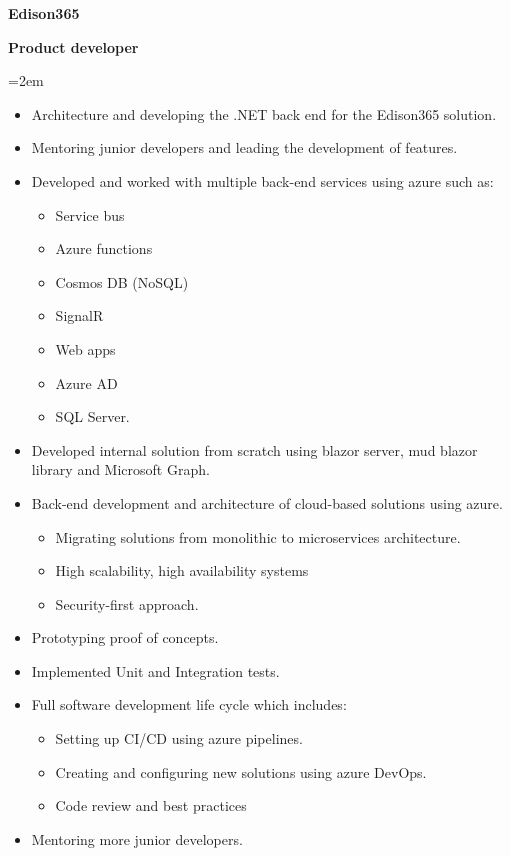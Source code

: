 \documentclass[paper=a4,fontsize=12pt]{article} %
\newcommand{\EducationEntry}[4]{
		\noindent \textbf{#1} \hfill      %
		\colorbox{White}{%
			\parbox{6em}{%
			\hfill\color{Black}#2}} \par  %
		\noindent \textbf{#3} \par        %
		\noindent\hangindent=2em\hangafter=0 \small #4 %
		\normalsize \par}
\begin{document}
\EducationEntry{Edison365}{\textbf{\hspace{-2cm}{May2021-August2024}}}{Product developer}{\begin{itemize}
		\itemsep-0.1em 
		\item Architecture and developing the .NET back end for the Edison365 solution.
		\item Mentoring junior developers and leading the development of features.
		\item Developed and worked with multiple back-end services using azure such as:
			\begin{itemize}
                 \item  Service bus
                  \item Azure functions
                  \item Cosmos DB (NoSQL)
                   \item SignalR
				\item Web apps 
                    \item Azure AD
                    \item SQL Server.
	  	\end{itemize}
           \item  Developed internal solution from scratch using blazor server, mud blazor library and Microsoft Graph.
    \item Back-end development and architecture of cloud-based solutions using azure.
			\begin{itemize}
                 \item Migrating solutions from monolithic to microservices architecture.
                 \item  High scalability, high availability systems
                 \item Security-first approach.
			\end{itemize}
\item Prototyping proof of concepts.
\item Implemented Unit and Integration tests.
\item  Full software development life cycle which includes:
 		\begin{itemize}
               \item Setting up CI/CD using azure pipelines.
                \item Creating and configuring new solutions using azure DevOps.  
                  \item Code review and best practices              
           \end{itemize}
\item Mentoring more junior developers.

\end{itemize} }
\end{document}
